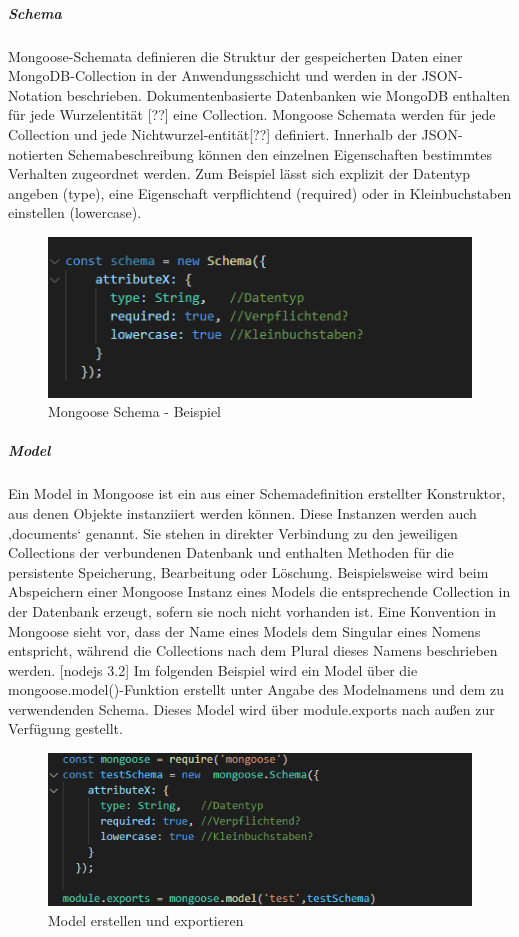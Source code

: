\subparagraph{Schema}
Mongoose-Schemata definieren die Struktur der gespeicherten Daten einer MongoDB-Collection in der Anwendungsschicht und werden in der JSON-Notation beschrieben. Dokumentenbasierte Datenbanken wie MongoDB enthalten für jede Wurzelentität [??] eine Collection. Mongoose Schemata werden für jede Collection und jede Nichtwurzel-entität[??] definiert. Innerhalb der JSON-notierten Schemabeschreibung können den einzelnen Eigenschaften bestimmtes Verhalten zugeordnet werden. Zum Beispiel lässt sich explizit der Datentyp angeben (type), eine Eigenschaft verpflichtend (required) oder in Kleinbuchstaben einstellen (lowercase).
\newline

\begin{figure}[h]
\centering
\includegraphics{images/nodeJS_mongooseSchema.PNG}
\caption{Mongoose Schema - Beispiel}
\end{figure}

\newpage
\subparagraph{Model}
Ein Model in Mongoose ist ein aus einer Schemadefinition erstellter Konstruktor, aus denen Objekte instanziiert werden können. Diese Instanzen werden auch ‚documents‘ genannt. Sie stehen in direkter Verbindung zu den jeweiligen Collections der verbundenen Datenbank und enthalten Methoden für die persistente Speicherung, Bearbeitung oder Löschung. Beispielsweise wird beim Abspeichern einer Mongoose Instanz eines Models die entsprechende Collection in der Datenbank erzeugt, sofern sie noch nicht vorhanden ist. Eine Konvention in Mongoose sieht vor, dass der Name eines Models dem Singular eines Nomens entspricht, während die Collections nach dem Plural dieses Namens beschrieben werden. [nodejs 3.2] Im folgenden Beispiel wird ein Model über die mongoose.model()-Funktion erstellt unter Angabe des Modelnamens und dem zu verwendenden Schema. Dieses Model wird über module.exports nach außen zur Verfügung gestellt.

\begin{figure}[h]
\centering
\includegraphics{images/nodeJS_mongooseModell.PNG}
\caption{Model erstellen und exportieren}
\end{figure}

